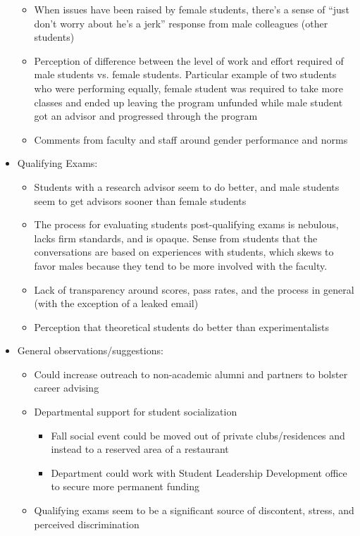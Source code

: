 \documentclass[oneside]{book}   %
\begin{document}
\begin{itemize}
\begin{itemize}
			\item When issues have been raised by female students, there’s a sense of “just don’t worry about he’s a jerk” response from male colleagues (other students)
			\item Perception of difference between the level of work and effort required of male students vs. female students. Particular example of two students who were performing equally, female student was required to take more classes and ended up leaving the program unfunded while male student got an advisor and progressed through the program
			\item Comments from faculty and staff around gender performance and norms
		\end{itemize}
	\item Qualifying Exams:
		\begin{itemize}
			\item Students with a research advisor seem to do better, and male students seem to get advisors sooner than female students
			\item The process for evaluating students post-qualifying exams is nebulous, lacks firm standards, and is opaque. Sense from students that the conversations are based on experiences with students, which skews to favor males because they tend to be more involved with the faculty.  
			\item Lack of transparency around scores, pass rates, and the process in general (with the exception of a leaked email)
			\item Perception that theoretical students do better than experimentalists
		\end{itemize}
	\item General observations/suggestions:
		\begin{itemize}
			\item Could increase outreach to non-academic alumni and partners to bolster career advising
			\item Departmental support for student socialization
				\begin{itemize}
					\item Fall social event could be moved out of private clubs/residences and instead to a reserved area of a restaurant 
					\item Department could work with Student Leadership Development office to secure more permanent funding 
				\end{itemize}
			\item Qualifying exams seem to be a significant source of discontent, stress, and perceived discrimination

\end{itemize}
\end{itemize}
\end{document}
